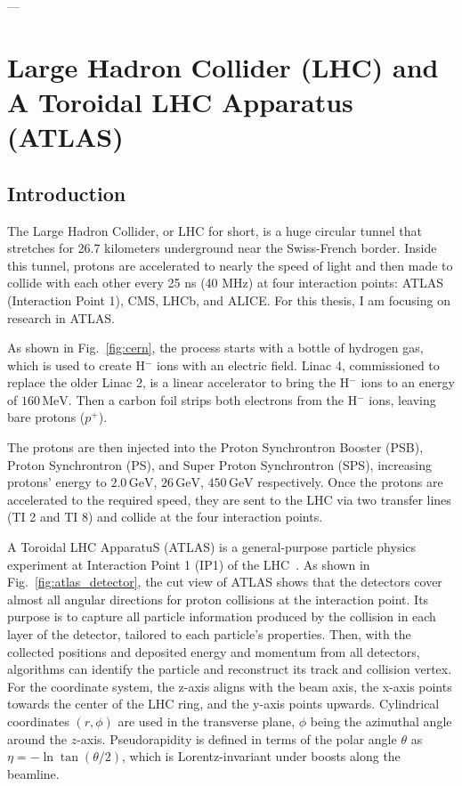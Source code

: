 ---

\section{Large Hadron Collider (LHC) and A Toroidal LHC Apparatus (ATLAS)}
\subsection{Introduction}

The Large Hadron Collider, or LHC for short, is a huge circular tunnel that stretches for 26.7 kilometers underground near the Swiss-French border. Inside this tunnel, protons are accelerated to nearly the speed of light and then made to collide with each other every 25 ns (40 MHz) at four interaction points: ATLAS (Interaction Point 1), CMS, LHCb, and ALICE. For this thesis, I am focusing on research in ATLAS. 

As shown in Fig.~\ref{fig:cern}, the process starts with a bottle of hydrogen gas, which is used to create H$^-$ ions with an electric field. Linac 4, commissioned to replace the older Linac 2, is a linear accelerator to bring the H$^-$ ions to an energy of  $160 \, \text{MeV}$. Then a carbon foil strips both electrons from the H$^-$ ions, leaving bare protons ($p^+$). 

The protons are then injected into the Proton Synchrontron Booster (PSB), Proton Synchrontron (PS), and Super Proton Synchrontron (SPS), increasing protons' energy to  $2.0 \, \text{GeV}$, $26 \, \text{GeV}$, $450 \, \text{GeV}$ respectively. Once the protons are accelerated to the required speed, they are sent to the LHC via two transfer lines (TI 2 and TI 8) and collide at the four interaction points.

A Toroidal LHC ApparatuS (ATLAS) is a general-purpose particle physics experiment at Interaction Point 1 (IP1) of the LHC~\cite{ATLASdetector}. As shown in Fig.~\ref{fig:atlas_detector}, the cut view of ATLAS shows that the detectors cover almost all angular directions for proton collisions at the interaction point. Its purpose is to capture all particle information produced by the collision in each layer of the detector, tailored to each particle's properties. Then, with the collected positions and deposited energy and momentum from all detectors, algorithms can identify the particle and reconstruct its track and collision vertex. For the coordinate system, the z-axis aligns with the beam axis, the x-axis points towards the center of the LHC ring, and the y-axis points upwards. Cylindrical coordinates $(r,\phi)$ are used in the transverse plane, $\phi$ being the azimuthal angle around the $z$-axis. Pseudorapidity is defined in terms of the polar angle $\theta$ as $\eta = -\ln \tan(\theta/2)$, which is Lorentz-invariant under boosts along the beamline.

